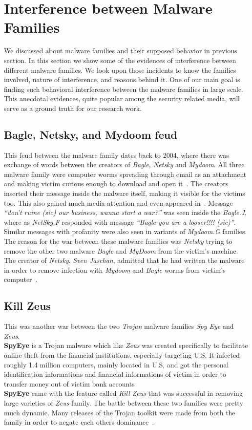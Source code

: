 \section{Interference between Malware Families}
\label{sec:Interference between Malware Families}
We discussed about malware families and their supposed behavior in previous section.
In this section we show some of the evidences of interference between different malware families.
We look upon those incidents to know the families involved, nature of interference, and reasons behind it.
One of our main goal is finding such behavioral interference between the malware families in large scale.
This anecdotal evidences, quite popular among the security related media, will serve as a ground truth for our research work.
\subsection{Bagle, Netsky, and Mydoom feud}
\label{sub:Bagle, Netsky, and Mydoom feud}
This feud between the malware family dates back to 2004, where there was exchange of words between the creators of \emph{Bagle, Netsky} and \emph{Mydoom}.
All three malware family were computer worms spreading through email as an attachment and making victim curious enough to download and open it~\cite[]{wikinetsky}.
The creators inserted their message inside the malware itself, making it visible for the victims too. This also gained much media attention and even appeared in~\cite[BBC]{bbccover}.
Message \emph{``don't ruine (sic) our business, wanna start a war?''} was seen inside the \emph{Bagle.J}, where as \emph{NetSky.F} responded with message \emph{``Bagle \- you are a looser!!!! (sic)''}.
Similar messages with profanity were also seen in variants of \emph{Mydoom.G} families.\\
The reason for the war between these malware families was \emph{Netsky} trying to remove the other two malware \emph{Bagle} and \emph{MyDoom} from the victim's machine.
The creator of \emph{Netsky}, \emph{Sven Jaschan}, admitted that he had written the malware in order to remove infection with \emph{Mydoom} and \emph{Bagle} worms from victim's computer~\cite[]{wikinetsky}.\\
\subsection{Kill Zeus}
\label{sub:Kill Zeus}
This was another war between the two \emph{Trojan} malware families \emph{Spy Eye} and \emph{Zeus}.\\
\textbf{SpyEye} is a Trojan malware which like \emph{Zeus} was created specifically to facilitate online theft from the financial institutions, especially targeting U.S.
It infected roughly 1.4 million computers, mainly located in U.S, and got the personal identification informations and financial informations of victim in order to transfer money out of victim bank accounts~\cite[]{fbispyeye} \\
\textbf{SpyEye} came with the feature called \emph{Kill Zeus} that was successful in removing large varieties of \emph{Zeus} family.
The battle between these two families were pretty much dynamic.
Many releases of the Trojan toolkit were made from both the family in order to negate each others dominance~\cite[]{sanszeus}.
